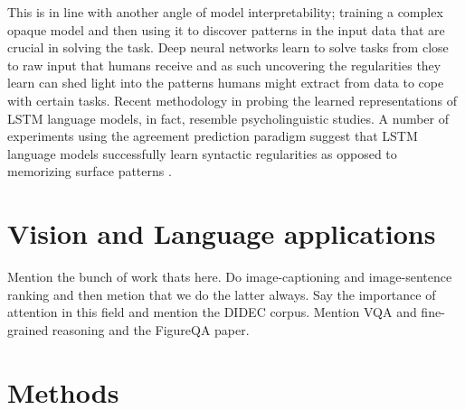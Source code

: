 This is in line with another angle of model interpretability; training a complex opaque model and then using it to discover patterns in the
input data that are crucial in solving the task. Deep neural networks learn to solve tasks from close to raw input that humans receive and as such
uncovering the regularities they learn can shed light into the patterns humans might extract from data to cope with certain tasks.
Recent methodology in probing the learned representations of LSTM language models, in fact, resemble psycholinguistic studies.
A number of experiments using the agreement prediction paradigm \cite{bock1991broken} suggest that
LSTM language models successfully learn syntactic regularities as opposed to memorizing surface patterns
\cite{linzen2016assessing,enguehard2017exploring,bernardy2017using,gulordava2018colorless}.

\section{Vision and Language applications}
Mention the bunch of work thats here. Do image-captioning and image-sentence ranking and then metion that we do the latter always. Say the importance of attention in this field and mention the DIDEC corpus. Mention VQA and fine-grained reasoning and the FigureQA paper.



\section{Methods}

